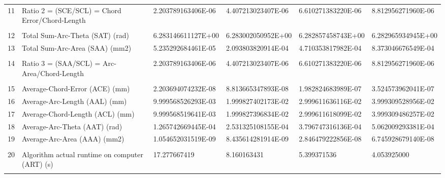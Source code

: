\begin{landscape}
\begin{table}[ht]
{\begin{tabular}{ p{0.2cm} p{8.80cm} p{4.00cm} p{4.0cm} p{4.00cm} p{4.0cm}}
				11	&	Ratio 2 = (SCE/SCL) = Chord Error/Chord-Length	&	2.203789163406E-06	&	4.407213023407E-06	&	6.610271383220E-06	&	8.812956271960E-06	\\
				&		&		&		&		&		\\
				12	&	Total Sum-Arc-Theta (SAT) (rad)	&	6.283146611127E+00	&	6.283002050952E+00	&	6.282857458743E+00	&	6.282965934945E+00	\\
				13	&	Total Sum-Arc-Area (SAA) (mm2)	&	5.235292684461E-05	&	2.093803820914E-04	&	4.710353817982E-04	&	8.373046676549E-04	\\
				&		&		&		&		&		\\
				14	&	Ratio 3 = (SAA/SCL) = Arc-Area/Chord-Length	&	2.203789163406E-06	&	4.407213023407E-06	&	6.610271383220E-06	&	8.812956271960E-06	\\
				&		&		&		&		&		\\
				15	&	Average-Chord-Error (ACE) (mm)	&	2.203694074232E-08	&	8.813665347893E-08	&	1.982824683989E-07	&	3.524573962041E-07	\\
				16	&	Average-Arc-Length (AAL) (mm)	&	9.999568526293E-03	&	1.999827402173E-02	&	2.999611636116E-02	&	3.999309528956E-02	\\
				17	&	Average-Chord-Length (ACL) (mm)	&	9.999568519641E-03	&	1.999827396834E-02	&	2.999611618099E-02	&	3.999309486257E-02	\\
				18	&	Average-Arc-Theta (AAT) (rad)	&	1.265742669445E-04	&	2.531325108155E-04	&	3.796747316136E-04	&	5.062009293381E-04	\\
				19	&	Average-Arc-Area (AAA) (mm2)	&	1.054652031519E-09	&	8.435614281914E-09	&	2.846479222856E-08	&	6.745928679140E-08	\\
				&		&		&		&		&		\\
				20	&	Algorithm actual runtime on computer (ART) (s) 	&	17.277667419	&	8.160163431	&	5.399371536	&	4.053925000	\\
				&		&		&		&		&	\\	
\hline				
\end{tabular}
			
}   %
\end{table}
\end{landscape}

